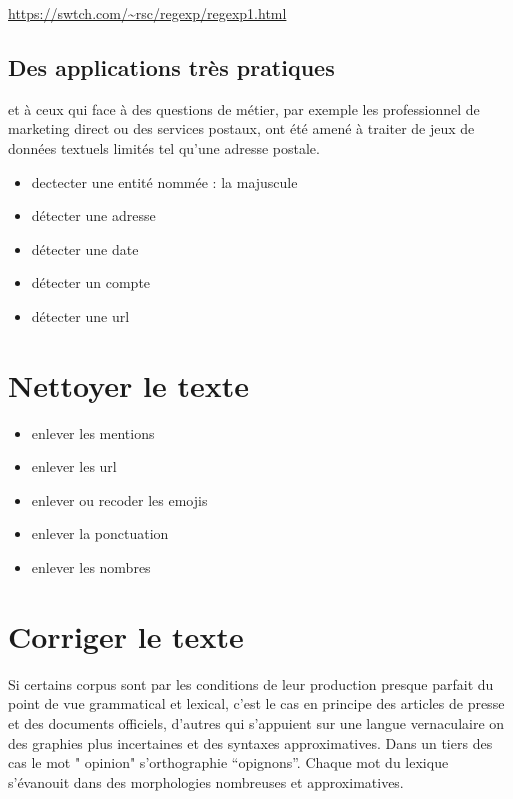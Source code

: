\documentclass[
]{book}
\providecommand{\tightlist}{%
  \setlength{\itemsep}{0pt}\setlength{\parskip}{0pt}}
\begin{document}
\url{https://swtch.com/~rsc/regexp/regexp1.html}

\hypertarget{des-applications-truxe8s-pratiques}{%
\subsection{Des applications très pratiques}\label{des-applications-truxe8s-pratiques}}

et à ceux qui face à des questions de métier, par exemple les professionnel de marketing direct ou des services postaux, ont été amené à traiter de jeux de données textuels limités tel qu'une adresse postale.

\begin{itemize}
\item
  dectecter une entité nommée : la majuscule
\item
  détecter une adresse
\item
  détecter une date
\item
  détecter un compte
\item
  détecter une url
\end{itemize}

\hypertarget{nettoyer-le-texte}{%
\section{Nettoyer le texte}\label{nettoyer-le-texte}}

\begin{itemize}
\tightlist
\item
  enlever les mentions
\item
  enlever les url
\item
  enlever ou recoder les emojis
\item
  enlever la ponctuation
\item
  enlever les nombres
\end{itemize}

\hypertarget{corriger-le-texte}{%
\section{Corriger le texte}\label{corriger-le-texte}}

Si certains corpus sont par les conditions de leur production presque parfait du point de vue grammatical et lexical, c'est le cas en principe des articles de presse et des documents officiels, d'autres qui s'appuient sur une langue vernaculaire on des graphies plus incertaines et des syntaxes approximatives. Dans un tiers des cas le mot " opinion" s'orthographie ``opignons''. Chaque mot du lexique s'évanouit dans des morphologies nombreuses et approximatives.
\end{document}
